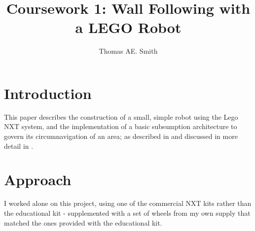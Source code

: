 \documentclass[a4paper,12pt]{article}
\title{Coursework 1:  Wall Following with a LEGO Robot}
\author{Thomas AE. Smith}
\begin{document}
\maketitle

\section{Introduction}


This paper describes the construction of a small, simple robot using the Lego NXT system, and the implementation of a basic subsumption architecture to govern its circumnavigation of an area; as described in \citet{BrooksAIJ91} and discussed in more detail in \citet{brooks1986robust}.

\section{Approach}



I worked alone on this project, using one of the commercial NXT kits rather than the educational kit - supplemented with a set of wheels from my own supply that matched the ones provided with the educational kit.
\end{document}
